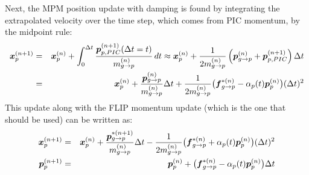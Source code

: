 \documentclass[11pt]{article}
\renewcommand{\vec}[1]{\boldsymbol{#1}}
\begin{document}
Next, the MPM position update with damping is found by integrating the extrapolated velocity over the time step, which comes from PIC momentum, by the midpoint rule:
\begin{eqnarray}
        \vec{x}_p^{(n+1)} & = & \vec{x}_p^{(n)} + \int_0^{\Delta t} {\vec p_{p,PIC}^{(n+1)}(\Delta t=t)\over m_{g\to p}^{(n)}}
         \thinspace dt \approx \vec{x}_p^{(n)} 
         + {1\over 2m_{g\to p}^{(n)}}\left(\vec p_{g\to p}^{(n)}+\vec p_{p,PIC}^{(n+1)}\right) \Delta t \\
         & = & \vec{x}_p^{(n)} + {\vec p_{g\to p}^{(n)}\over m_{g\to p}^{(n)}}\Delta t 
            + {1\over 2 m_{g\to p}^{(n)}} \bigl(\vec{f}_{g\to p}^{*(n)}  -  \alpha_p(t)\vec{p}_p^{(n)}\bigr)(\Delta t)^2 
\end{eqnarray}
This update along with the FLIP momentum update (which is the one that should be used) can be written as:
\begin{eqnarray}
   \vec{x}_{p}^{(n+1)} & = & \vec{x}_p^{(n)} + {\vec p_{g\to p}^{*(n+1)}\over m_{g\to p}^{(n)}}\Delta t 
       - {1 \over 2m_{g\to p}^{(n)}}\bigl(\vec{f}_{g\to p}^{*(n)} +  \alpha_p(t)\vec p_p^{(n)} \bigr)(\Delta t)^2 \\
   \vec{p}_{p}^{(n+1)} & = & \vec{p}_p^{(n)} +  \bigl(\vec{f}_{g\to p}^{*(n)} -  \alpha_p(t)\vec p_p^{(n)} \bigr)\Delta t
\end{eqnarray}
\end{document}
